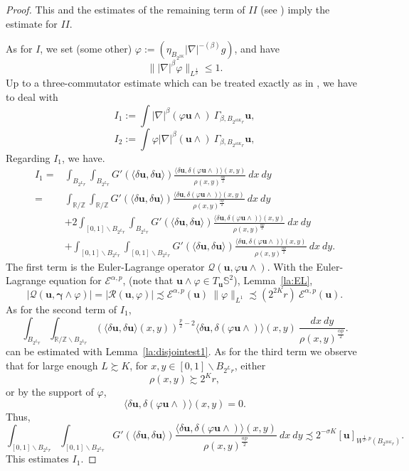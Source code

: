 \documentclass[a4paper,10pt,intlimits,ngerman]{amsart}
\newcommand{\iv}{B} %
\numberwithin{equation}{section}
\newcommand{\R}{\mathbb{R}}
\newcommand{\Z}{\mathbb{Z}}
\renewcommand{\S}{\mathbb{S}}
\newcommand{\sol}{{\boldsymbol{\gamma}}}
\newcommand{\solu}{{\boldsymbol{u}}}
\newcommand{\aleq}{\precsim}
\newcommand{\ageq}{\succsim}
\newcommand{\laps}[1]{|\nabla|^{#1}}
\newcommand{\lapms}[1]{|\nabla|^{-\brac{#1}}}
\newcommand{\brac}[1]{\left ( #1 \right )}
\newcommand{\dmv}[2]{\langle \delta #1, \delta #2\rangle}
\begin{document}
\begin{proof}
This and the estimates of the remaining term of $II$ (see \cite[Proof of Lemma 3.5]{SchikorraCPDE14}) imply the estimate for $II$.

As for $I$, we set (some other) $\varphi :=(\eta_{\iv_{2^{2K}}} \lapms{\beta} g)$, and have
\[
 \|\laps{\beta} \varphi \|_{L^{\frac{1}{\beta}}} \leq 1.
\]
Up to a three-commutator estimate which can be treated exactly as in \cite[Proof of Lemma 3.5]{SchikorraCPDE14}, we have to deal with
\[
 I_1 := \int \laps{\beta} (\varphi \solu \wedge)\ \Gamma_{\beta,\iv_{2^{10 K}r}} \solu,
\]
\[
 I_2 := \int \varphi \laps{\beta} (\solu \wedge) \ \Gamma_{\beta,\iv_{2^{10 K}r}} \solu,
\]
Regarding $I_1$, we have.
\[
\begin{split}
 I_1 =& \int_{\iv_{2^L r}}\int_{\iv_{2^L r}} G'(\dmv{\solu}{\solu}) \frac{\dmv{\solu}{(\varphi \solu \wedge)}(x,y)}{\rho(x,y)^{\frac{\alpha p}{2}}}\ dx\ dy\\
 =& \int_{\R/\Z}\int_{\R/\Z} G'(\dmv{\solu}{\solu}) \frac{\dmv{\solu}{(\varphi \solu \wedge)}(x,y)}{\rho(x,y)^{\frac{\alpha p}{2}}}\ dx\ dy\\
 &+ 2\int_{[0,1] \backslash \iv_{2^L r}}\int_{\iv_{2^L r}} G'(\dmv{\solu}{\solu}) \frac{\dmv{\solu}{(\varphi \solu \wedge)}(x,y)}{\rho(x,y)^{\frac{\alpha p}{2}}}\ dx\ dy\\
 &+ \int_{[0,1]\backslash \iv_{2^L r}}\int_{[0,1]\backslash \iv_{2^L r}} G'(\dmv{\solu}{\solu}) \frac{\dmv{\solu}{(\varphi \solu \wedge)}(x,y)}{\rho(x,y)^{\frac{\alpha p}{2}}}\ dx\ dy.
 \end{split}
\]
The first term is the Euler-Lagrange operator $\mathcal{Q}(\solu, \varphi \solu\wedge)$. With the Euler-Lagrange equation for $\mathcal{E}^{\alpha,p}$, (note that $\solu\wedge \varphi \in T_{\solu} \S^2$), Lemma~\ref{la:EL},
\[
  |\mathcal{Q}(\solu, \sol \wedge\varphi )| = |\mathcal{R}(\solu,\varphi)| \aleq \mathcal{E}^{\alpha,p}(\solu)\ \|\varphi \|_{L^1} \aleq (2^{2K} r)\ \mathcal{E}^{\alpha,p}(\solu).
\]
As for the second term of $I_1$,
\[
\int_{\iv_{2^L r}} \int_{\R/\Z \backslash \iv_{2^L r}} \brac{\dmv{\solu}{\solu}(x,y)}^{\frac{p}{2}-2} \dmv{\solu}{(\varphi\solu \wedge) }(x,y)\ \frac{dx\ dy}{\rho(x,y)^{\frac{\alpha p}{2}}}.
\]
can be estimated  with Lemma~\ref{la:disjointest1}.
As for the third term we observe that for large enough $L \ageq K$, for $x,y \in [0,1] \backslash \iv_{2^L r}$, either
\[
 \rho(x,y) \ageq 2^{K}r,
\]
or by the support of $\varphi$,
\[
 \dmv{\solu}{(\varphi\solu \wedge) }(x,y) = 0.
\]
Thus,
\[
 \int_{[0,1]\backslash \iv_{2^L r}}\int_{[0,1]\backslash \iv_{2^L r}} G'(\dmv{\solu}{\solu}) \frac{\dmv{\solu}{(\varphi \solu \wedge)}(x,y)}{\rho(x,y)^{\frac{\alpha p}{2}}}\ dx\ dy \aleq 2^{-\sigma K} [\solu]_{W^{\frac{1}{p},p}(\iv_{2^{20K}r})}.
\]
This estimates $I_1$.


\end{proof}
\end{document}
